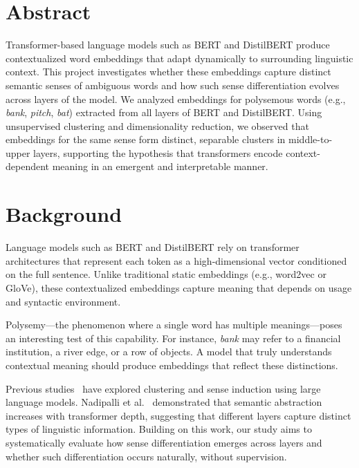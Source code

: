\documentclass{template}
\begin{document}
\maketitle


\section*{Abstract}
Transformer-based language models such as BERT and DistilBERT produce contextualized word embeddings that adapt dynamically to surrounding linguistic context. This project investigates whether these embeddings capture distinct semantic senses of ambiguous words and how such sense differentiation evolves across layers of the model. We analyzed embeddings for polysemous words (e.g., \textit{bank}, \textit{pitch}, \textit{bat}) extracted from all layers of BERT and DistilBERT. Using unsupervised clustering and dimensionality reduction, we observed that embeddings for the same sense form distinct, separable clusters in middle-to-upper layers, supporting the hypothesis that transformers encode context-dependent meaning in an emergent and interpretable manner.


\section*{Background}
Language models such as BERT and DistilBERT rely on transformer architectures that represent each token as a high-dimensional vector conditioned on the full sentence. Unlike traditional static embeddings (e.g., word2vec or GloVe), these contextualized embeddings capture meaning that depends on usage and syntactic environment.

Polysemy—the phenomenon where a single word has multiple meanings—poses an interesting test of this capability. For instance, \textit{bank} may refer to a financial institution, a river edge, or a row of objects. A model that truly understands contextual meaning should produce embeddings that reflect these distinctions.

Previous studies~\cite{yenicelik2020,petukhova2025} have explored clustering and sense induction using large language models. Nadipalli et al.~\cite{nadipalli2025} demonstrated that semantic abstraction increases with transformer depth, suggesting that different layers capture distinct types of linguistic information. Building on this work, our study aims to systematically evaluate how sense differentiation emerges across layers and whether such differentiation occurs naturally, without supervision.
\end{document}
